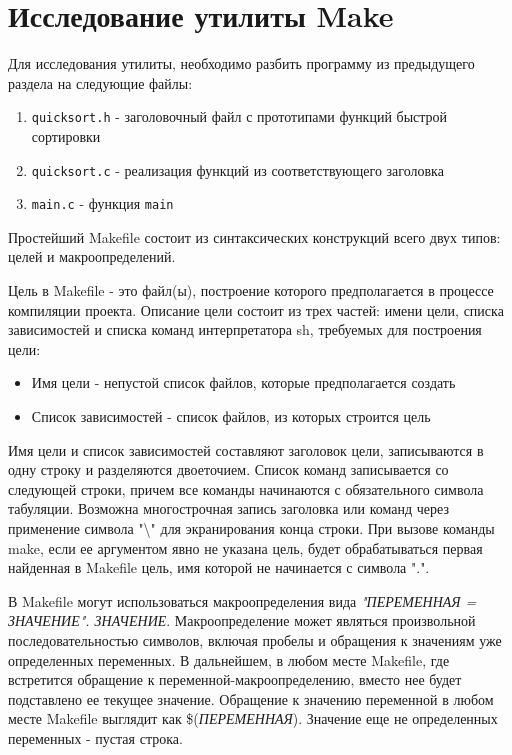 \section{Исследование утилиты Make}

Для исследования утилиты, необходимо разбить программу из предыдущего раздела на следующие файлы:
\begin{enumerate}
 \item \texttt{quicksort.h} - заголовочный файл с прототипами функций быстрой сортировки
 \item \texttt{quicksort.c} - реализация функций из соответствующего заголовка
 \item \texttt{main.c} - функция \texttt{main}
\end{enumerate}

Простейший Makefile состоит из синтаксических конструкций всего двух типов: целей и макроопределений.

Цель в Makefile - это файл(ы), построение которого предполагается в процессе компиляции проекта.
Описание цели состоит из трех частей: имени цели, списка зависимостей и списка команд интерпретатора sh, требуемых для построения цели:
\begin{itemize}
 \item Имя цели - непустой список файлов, которые предполагается создать
 \item Список зависимостей - список файлов, из которых строится цель
\end{itemize}

Имя цели и список зависимостей составляют заголовок цели, записываются в одну строку и разделяются двоеточием.
Список команд записывается со следующей строки, причем все команды начинаются с обязательного символа табуляции.
Возможна многострочная запись заголовка или команд через применение символа "\textbackslash" для экранирования конца строки.
При вызове команды make, если ее аргументом явно не указана цель, будет обрабатываться первая найденная в Makefile цель, имя которой не начинается с символа ".".

В Makefile могут использоваться макроопределения вида \textit{"ПЕРЕМЕННАЯ = ЗНАЧЕНИЕ". ЗНАЧЕНИЕ}.
Макроопределение может являться произвольной последовательностью символов, включая пробелы и обращения к значениям уже определенных переменных.
В дальнейшем, в любом месте Makefile, где встретится обращение к переменной-макроопределению, вместо нее будет подставлено ее текущее значение.
Обращение к значению переменной в любом месте Makefile выглядит как \$(\textit{ПЕРЕМЕННАЯ}). Значение еще не определенных переменных - пустая строка.

